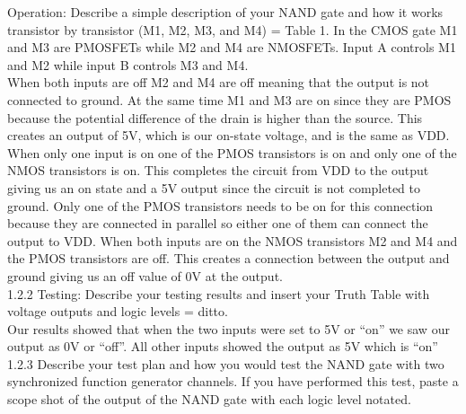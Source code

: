 \documentclass[9pt,a4paper]{report}
\begin{document}
Operation: Describe a simple description of your NAND gate and how it works transistor by transistor (M1, M2, M3, and M4) = Table 1. 
In the CMOS gate M1 and M3 are PMOSFETs while M2 and M4 are NMOSFETs. Input A controls M1 and M2 while input B controls M3 and M4.\\
When both inputs are off M2 and M4 are off meaning that the output is not connected to ground. At the same time M1 and M3 are on since they are PMOS because the potential difference of the drain is higher than the source. This creates an output of 5V, which is our on-state voltage, and is the same as VDD. \\
When only one input is on one of the PMOS transistors is on and only one of the NMOS transistors is on. This completes the circuit from VDD to the output giving us an on state and a 5V output since the circuit is not completed to ground. Only one of the PMOS transistors needs to be on for this connection because they are connected in parallel so either one of them can connect the output to VDD.
When both inputs are on the NMOS transistors M2 and M4 and the PMOS transistors are off.  This creates a connection between the output and ground giving us an off value of 0V at the output. \\

1.2.2 Testing: Describe your testing results and insert your Truth Table with voltage outputs and logic levels = ditto. \\
Our results showed that when the two inputs were set to 5V or “on” we saw our output as 0V or “off”. All other inputs showed the output as 5V which is “on”
1.2.3 Describe your test plan and how you would test the NAND gate with two synchronized function generator channels. If you have performed this test, paste a scope shot of the output of the NAND gate with each logic level notated.
\end{document}

